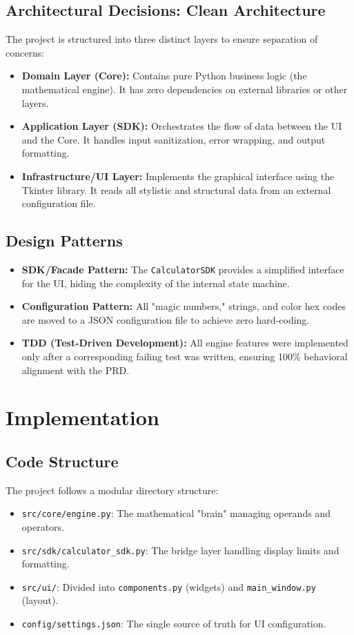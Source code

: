 \documentclass[12pt,a4paper]{article}
\begin{document}
\subsection{Architectural Decisions: Clean Architecture}
The project is structured into three distinct layers to ensure separation of concerns:
\begin{itemize}
    \item \textbf{Domain Layer (Core):} Contains pure Python business logic (the mathematical engine). It has zero dependencies on external libraries or other layers.
    \item \textbf{Application Layer (SDK):} Orchestrates the flow of data between the UI and the Core. It handles input sanitization, error wrapping, and output formatting.
    \item \textbf{Infrastructure/UI Layer:} Implements the graphical interface using the Tkinter library. It reads all stylistic and structural data from an external configuration file.
\end{itemize}

\subsection{Design Patterns}
\begin{itemize}
    \item \textbf{SDK/Facade Pattern:} The \texttt{CalculatorSDK} provides a simplified interface for the UI, hiding the complexity of the internal state machine.
    \item \textbf{Configuration Pattern:} All "magic numbers," strings, and color hex codes are moved to a JSON configuration file to achieve zero hard-coding.
    \item \textbf{TDD (Test-Driven Development):} All engine features were implemented only after a corresponding failing test was written, ensuring 100\% behavioral alignment with the PRD.
\end{itemize}

\section{Implementation}
\subsection{Code Structure}
The project follows a modular directory structure:
\begin{itemize}
    \item \texttt{src/core/engine.py}: The mathematical "brain" managing operands and operators.
    \item \texttt{src/sdk/calculator\_sdk.py}: The bridge layer handling display limits and formatting.
    \item \texttt{src/ui/}: Divided into \texttt{components.py} (widgets) and \texttt{main\_window.py} (layout).
    \item \texttt{config/settings.json}: The single source of truth for UI configuration.
\end{itemize}
\end{document}
